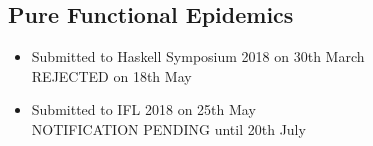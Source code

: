 \begin{appendices}

\chapter{Pure Functional Epidemics}
\label{app:pfe}
\begin{itemize}
	\item Submitted to Haskell Symposium 2018 on 30th March \\ REJECTED on 18th May
	\item Submitted to IFL 2018 on 25th May \\ NOTIFICATION PENDING until 20th July
\end{itemize}





\end{appendices}